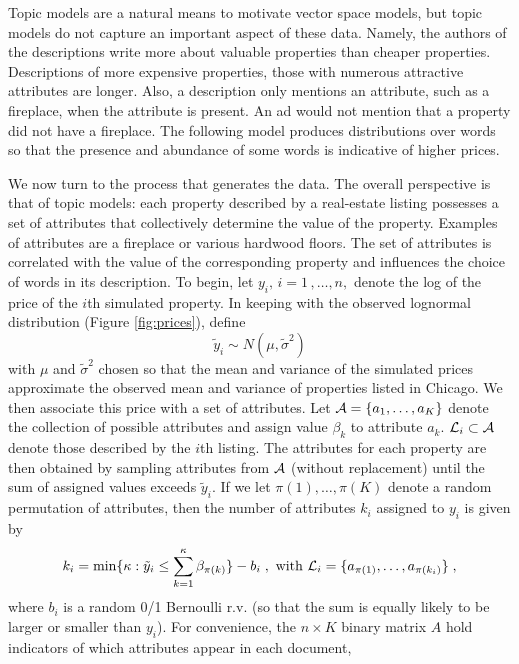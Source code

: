 \documentclass[10pt]{article}
\begin{document}
Topic models are a natural means to motivate vector space models, but topic models do not capture an important aspect of these data.  Namely, the authors of the descriptions write more about valuable properties than cheaper properties.  Descriptions of more expensive properties, those with numerous attractive attributes are longer.  Also, a description only mentions an attribute, such as a fireplace, when the attribute is present.  An ad would not mention that a property did not have a fireplace.  The following model produces distributions over words so that the presence and abundance of some words is indicative of higher prices.


\clearpage


We now turn to the process that generates the data.  The overall perspective is that of topic models: each property described by a real-estate listing possesses a set of attributes that collectively determine the value of the property.   Examples of attributes are a fireplace or various hardwood floors.  The set of attributes is correlated with the value of the corresponding property and influences the choice of words in its description.  To begin, let $y_i, \, i = 1\,,\ldots, n,$ denote the log of the price of the $i$th simulated property.  In keeping with the observed lognormal distribution (Figure \ref{fig:prices}), define
\begin{equation}
	\tilde{y}_i \sim N(\mu, \tilde\sigma^2)
\end{equation}
with $\mu $ and $\tilde\sigma^2$ chosen so that the mean and variance of the simulated prices approximate the observed mean and variance of properties listed in Chicago.  We then associate this price with a set of attributes.  Let ${\cal A} = \{a_1,\ldots, a_K\}$ denote the collection of  possible attributes and assign value $\beta_k$ to attribute $a_k$.  ${\cal L}_i \subset {\cal A}$ denote those described by the $i$th listing.  The attributes for each property are then obtained by sampling attributes from $\cal A$ (without replacement) until the sum of assigned values exceeds $\tilde{y}_i$.  If we let $\pi(1), \ldots, \pi(K)$ denote a random permutation of attributes, then the number of attributes $k_i$ assigned to $y_i$ is given by
\begin{equation}
	k_i = \min \{ \kappa:  \tilde{y}_i \le \sum_{k=1}^{\kappa} \beta_{\pi(k)} \} - b_i \;,
	\mbox{ with }
	{\cal L}_i = \{a_{\pi(1)}, \ldots, a_{\pi(k_i)} \} \;,
\end{equation}
where $b_i$ is a random 0/1 Bernoulli r.v. (so that the sum is equally likely to be larger or smaller than $y_i$).  For convenience,  the $n \times K$ binary matrix $A$ hold indicators of which attributes appear in each document,
\end{document}

